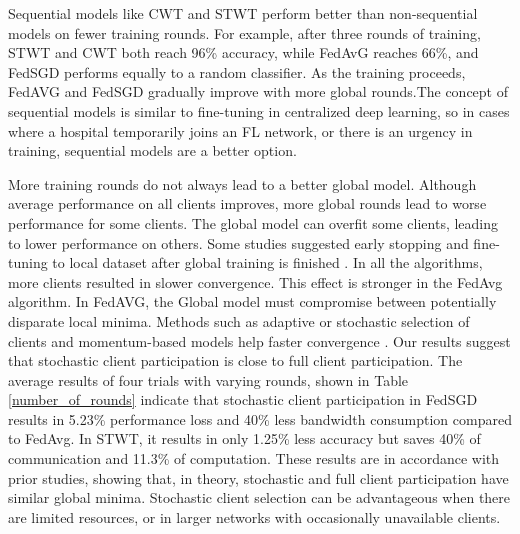

 



Sequential models like CWT and STWT perform better than non-sequential models on fewer training rounds. For example,  after three rounds of training, STWT and CWT both reach 96\% accuracy, while FedAvG reaches 66\%, and FedSGD performs equally to a random classifier. As the training proceeds, FedAVG and FedSGD gradually improve with more global rounds.The concept of sequential models is similar to fine-tuning \cite{chen2020online} in centralized deep learning, so in cases where a hospital temporarily joins an FL network, or there is an urgency in training, sequential models are a better option.

More training rounds do not always lead to a better global model. Although average performance on all clients improves, more global rounds lead to worse performance for some clients. The global model can overfit some clients, leading to lower performance on others\cite{mohri2019agnostic}. Some studies suggested early stopping and fine-tuning to local dataset after global training is finished \cite{yu2020salvaging}. 
In all the algorithms, more clients resulted in slower convergence. This effect is stronger in the FedAvg algorithm. In FedAVG, the Global model must compromise between potentially disparate local minima\cite{li2019convergence}. Methods such as adaptive or stochastic selection of clients and momentum-based models help faster convergence \cite{liu2020accelerating}.
Our results suggest that stochastic client participation is close to full client participation. The average results of four trials with varying rounds, shown in Table \ref{number_of_rounds} indicate that stochastic client participation in FedSGD results in 5.23\% performance loss and 40\% less bandwidth consumption compared to FedAvg. In STWT, it results in only 1.25\% less accuracy but saves 40\% of communication and 11.3\% of computation.
These results are in accordance with prior studies, showing that, in theory, stochastic and full client participation have similar global minima\cite{cho2020client}. Stochastic client selection can be advantageous when there are limited resources, or in larger networks with occasionally unavailable clients.


